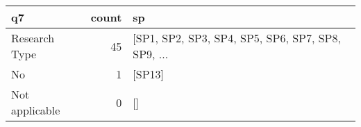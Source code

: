 \begin{tabular}{lrl}
\toprule
             q7 &  count &                                                 sp \\
\midrule
  Research Type &     45 &  [SP1, SP2, SP3, SP4, SP5, SP6, SP7, SP8, SP9, ... \\
             No &      1 &                                             [SP13] \\
 Not applicable &      0 &                                                 [] \\
\bottomrule
\end{tabular}
